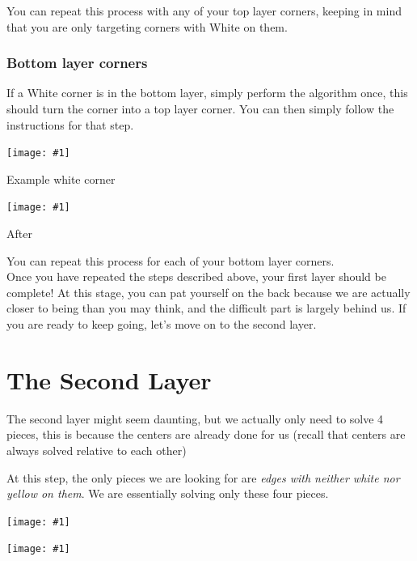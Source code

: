 \documentclass[12pt,letterpaper]{article}
\newcommand{\alg}[1]{
  \tcbox{
    {\tt #1}
  }
}
\newcommand{\pic}[1]{
  \begin{center}
	  \texttt{[image: \#1]}
  \end{center}
}
\newcommand{\npic}[2]{
  \begin{center}
	  \texttt{[image: \#1]}

	  {#2}
  \end{center}
}
\begin{document}
You can repeat this process with any of your top layer corners, keeping in mind
that you are only targeting corners with {\sc White} on them.


\subsubsection{Bottom layer corners}

If a {\sc White} corner is in the bottom layer, simply perform the algorithm
once, this should turn the corner into a top layer corner. You can then simply
follow the instructions for that step.

\begin{multicols}{2}
  \npic{first_layer/bottom_layer_corner_inserted}{Example white corner}

  \npic{first_layer/bottom_layer_corner_out}{After \alg{R U R' U'}}
\end{multicols}

You can repeat this process for each of your bottom layer corners. \\


Once you have repeated the steps described above, your first layer should be
complete! At this stage, you can pat yourself on the back because we are
actually closer to being than you may think, and the difficult part is largely
behind us. If you are ready to keep going, let's move on to the second layer.



\newpage

\section{The Second Layer}


The second layer might seem daunting, but we actually only need to solve 4
pieces, this is because the centers are already done for us (recall that centers
are always solved relative to each other)

At this step, the only pieces we are looking for are {\it edges with neither
{\sc white} nor {\sc yellow} on them}. We are essentially solving only these
four pieces.

\begin{multicols}{2}

  \pic{second_layer/pieces_1}

  \pic{second_layer/pieces_3}
  
\end{multicols}
\end{document}
